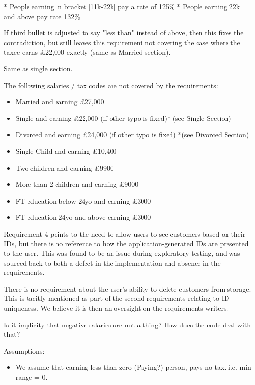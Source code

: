 * People earning in bracket [11k-22k[ pay a rate of 125\%
* People earning 22k and above pay rate 132\%

If third bullet is adjusted to say "less than" instead of above, then this fixes the contradiction, but still leaves this requirement not covering the case where the taxee earns £22,000 exactly (same as Married section). 

Same as single section. 

The following salaries / tax codes are not covered by the requirements: 
\begin{itemize}
	\item Married and earning £27,000
	\item Single and earning £22,000 (if other typo is fixed)* (see Single Section)
	\item Divorced and earning £24,000 (if other typo is fixed) *(see Divorced Section)
	\item Single Child and earning £10,400
	\item Two children and earning £9900
	\item More than 2 children and earning £9000
	\item FT education below 24yo and earning £3000
	\item FT education 24yo and above earning £3000
\end{itemize}


Requirement 4 points to the need to allow users to see customers based on their IDs, but there is no reference to how the application-generated IDs are presented to the user. This was found to be an issue during exploratory testing, and was sourced back to both a defect in the implementation and absence in the requirements. 

There is no requirement about the user's ability to delete customers from storage. This is tacitly mentioned as part of the second requirements relating to ID uniqueness. We believe it is then an oversight on the requirements writers. 


Is it implicity that negative salaries are not a thing? How does the code deal with that? 

Assumptions: 
\begin{itemize}
	\item We assume that earning less than zero (Paying?) person, pays no tax. i.e. min range = 0. 
\end{itemize}



